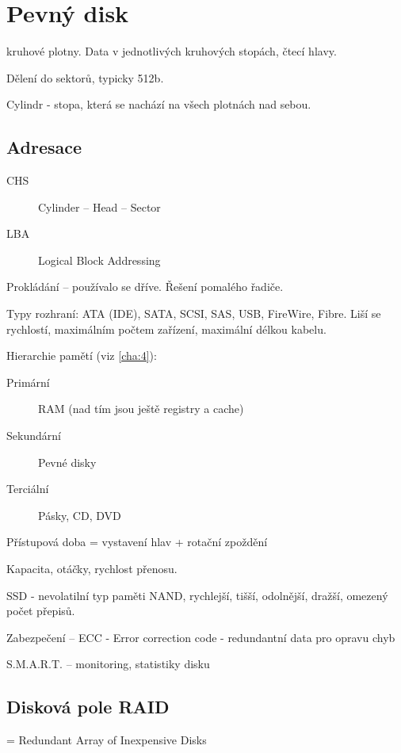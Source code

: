 \documentclass[a4wide]{report}
\begin{document}
\section{Pevný disk}

kruhové plotny. Data v jednotlivých kruhových stopách, čtecí hlavy.

Dělení do sektorů, typicky 512b.

Cylindr - stopa, která se nachází na všech plotnách nad sebou.

\subsection{Adresace}
\begin{description}
	\item[CHS] Cylinder -- Head -- Sector
	\item[LBA] Logical Block Addressing
\end{description}

Prokládání -- používalo se dříve. Řešení pomalého řadiče.

Typy rozhraní: ATA (IDE), SATA, SCSI, SAS, USB, FireWire, Fibre. Liší se rychlostí, maximálním počtem zařízení, maximální délkou kabelu.

Hierarchie pamětí (viz \ref{cha:4}):
\begin{description}
	\item[Primární] RAM (nad tím jsou ještě registry a cache)
	\item[Sekundární] Pevné disky
	\item[Terciální] Pásky, CD, DVD
\end{description}

Přístupová doba = vystavení hlav + rotační zpoždění

Kapacita, otáčky, rychlost přenosu.

SSD - nevolatilní typ paměti NAND, rychlejší, tišší, odolnější, dražší, omezený počet přepisů.

Zabezpečení -- ECC - Error correction code - redundantní data pro opravu chyb

S.M.A.R.T. -- monitoring, statistiky disku

\subsection{Disková pole RAID}
 = Redundant Array of Inexpensive Disks
\end{document}
